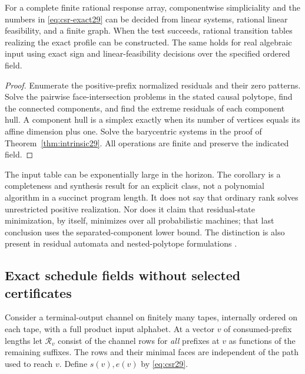 \begin{corollary}
\label{cor:decidable29}
For a complete finite rational response array, componentwise simpliciality
and the numbers in \eqref{eq:csr-exact29} can be decided from linear
systems, rational linear feasibility, and a finite graph. When the test
succeeds, rational transition tables realizing the exact profile can be
constructed. The same holds for real algebraic input using exact sign
and linear-feasibility decisions over the specified ordered field.
\end{corollary}
\begin{proof}
Enumerate the positive-prefix normalized residuals and their zero
patterns. Solve the pairwise face-intersection problems in the stated
causal polytope, find the connected components, and find the extreme
residuals of each component hull. A component hull is a simplex exactly
when its number of vertices equals its affine dimension plus one.
Solve the barycentric systems in the proof of Theorem~\ref{thm:intrinsic29}.
All operations are finite and preserve the indicated field.
\end{proof}

The input table can be exponentially large in the horizon. The corollary
is a completeness and synthesis result for an explicit class, not a
polynomial algorithm in a succinct program length. It does not say that
ordinary rank solves unrestricted positive realization. Nor does it
claim that residual-state minimization, by itself, minimizes over all
probabilistic machines; that last conclusion uses the separated-component
lower bound. The distinction is also present in residual automata
\cite{DenisEsposito} and nested-polytope formulations \cite{GG}.

\subsection{Exact schedule fields without selected certificates}
Consider a terminal-output channel on finitely many tapes, internally
ordered on each tape, with a full product input alphabet. At a vector
$v$ of consumed-prefix lengths let $\mathscr R_v$ consist of the
channel rows for \emph{all} prefixes at $v$ as functions of the remaining
suffixes. The rows and their minimal faces are independent of the path
used to reach $v$. Define $s(v),e(v)$ by \eqref{eq:csr29}.

